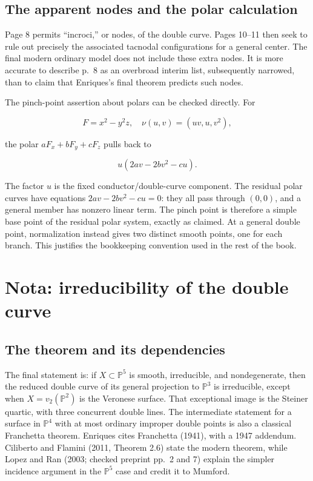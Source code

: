 \subsection{The apparent nodes and the polar calculation}

Page 8 permits ``incroci,'' or nodes, of the double curve. Pages 10--11 then seek to rule out precisely the associated tacnodal configurations for a general center. The final modern ordinary model does not include these extra nodes. It is more accurate to describe p.~8 as an overbroad interim list, subsequently narrowed, than to claim that Enriques's final theorem predicts such nodes.

The pinch-point assertion about polars can be checked directly. For

\[
F=x^2-y^2z,
\quad
\nu(u,v)=(uv,u,v^2),
\]

the polar \(aF_x+bF_y+cF_z\) pulls back to

\[
u(2av-2bv^2-cu).
\]

The factor \(u\) is the fixed conductor/double-curve component. The residual polar curves have equations \(2av-2bv^2-cu=0\): they all pass through \((0,0)\), and a general member has nonzero linear term. The pinch point is therefore a simple base point of the residual polar system, exactly as claimed. At a general double point, normalization instead gives two distinct smooth points, one for each branch. This justifies the bookkeeping convention used in the rest of the book.

\section{Nota: irreducibility of the double curve}
\label{enriques-intro-5}

\subsection{The theorem and its dependencies}

The final statement is: if \(X\subset\mathbb P^5\) is smooth, irreducible, and nondegenerate, then the reduced double curve of its general projection to \(\mathbb P^3\) is irreducible, except when \(X=v_2(\mathbb P^2)\) is the Veronese surface. That exceptional image is the Steiner quartic, with three concurrent double lines. The intermediate statement for a surface in \(\mathbb P^4\) with at most ordinary improper double points is also a classical Franchetta theorem. Enriques cites Franchetta (1941), with a 1947 addendum. Ciliberto and Flamini (2011, Theorem 2.6) state the modern theorem, while Lopez and Ran (2003; checked preprint pp.~2 and 7) explain the simpler incidence argument in the \(\mathbb P^5\) case and credit it to Mumford.

